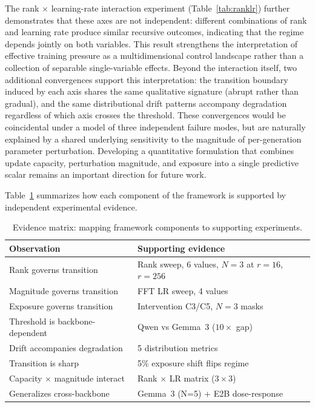 \documentclass[a4paper,fleqn]{cas-dc}
\renewcommand{\arraystretch}{1.8}
\begin{document}
The rank $\times$ learning-rate interaction experiment
(Table~\ref{tab:ranklr}) further demonstrates that these axes are not
independent: different combinations of rank and learning rate produce similar
recursive outcomes, indicating that the regime depends jointly on both variables.
This result strengthens the interpretation of effective training pressure as a
multidimensional control landscape rather than a collection of separable
single-variable effects. Beyond the interaction itself, two additional
convergences support this interpretation:
the transition boundary induced by each axis shares the same qualitative
signature (abrupt rather than gradual), and the same distributional drift patterns
accompany degradation regardless of which axis crosses the threshold. These
convergences would be coincidental under a model of three independent failure
modes, but are naturally explained by a shared underlying sensitivity to the
magnitude of per-generation parameter perturbation. Developing a quantitative
formulation that combines update capacity, perturbation magnitude, and exposure
into a single predictive scalar remains an important direction for future work.

Table~\ref{tab:evidence} summarizes how each component of the framework is
supported by independent experimental evidence.

\begin{table}[htbp]
\caption{Evidence matrix: mapping framework components to supporting
experiments.}\label{tab:evidence}
\footnotesize
\renewcommand{\arraystretch}{1.4}
\begin{tabularx}{\columnwidth}{@{}lX@{}}
\toprule
\textbf{Observation} & \textbf{Supporting evidence} \\
\midrule
Rank governs transition & Rank sweep, 6 values, $N{=}3$ at $r{=}16$, $r{=}256$ \\
\addlinespace
Magnitude governs transition & FFT LR sweep, 4 values \\
\addlinespace
Exposure governs transition & Intervention C3/C5, $N{=}3$ masks \\
\addlinespace
Threshold is backbone-dependent & Qwen vs Gemma~3 ($10{\times}$ gap) \\
\addlinespace
Drift accompanies degradation & 5 distribution metrics \\
\addlinespace
Transition is sharp & 5\% exposure shift flips regime \\
\addlinespace
Capacity $\times$ magnitude interact & Rank $\times$ LR matrix ($3{\times}3$) \\
\addlinespace
Generalizes cross-backbone & Gemma~3 (N=5) + E2B dose-response \\
\bottomrule
\end{tabularx}
\end{table}
\end{document}
